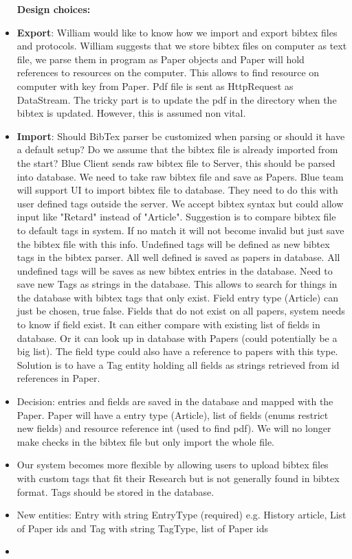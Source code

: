 \begin{itemize}
	\item [\textbf{Design choices:}]
	\item \textbf{Export}: William would like to know how we import and export bibtex files and protocols. William suggests that we store bibtex files on computer as text file, we parse them in program as Paper objects and Paper will hold references to resources on the computer. This allows to find resource on computer with key from Paper. Pdf file is sent as HttpRequest as DataStream. The tricky part is to update the pdf in the directory when the bibtex is updated. However, this is assumed non vital.
	\item \textbf{Import}: Should BibTex parser be customized when parsing or should it have a default setup? Do we assume that the bibtex file is already imported from the start? Blue Client sends raw bibtex file to Server, this should be parsed into database. We need to take raw bibtex file and save as Papers. Blue team will support UI to import bibtex file to database. They need to do this with user defined tags outside the server. We accept bibtex syntax but could allow input like "Retard" instead of "Article". Suggestion is to compare bibtex file to default tags in system. If no match it will not become invalid but just save the bibtex file with this info. Undefined tags will be defined as new bibtex tags in the bibtex parser. All well defined is saved as papers in database. All undefined tags will be saves as new bibtex entries in the database. Need to save new Tags as strings in the database. This allows to search for things in the database with bibtex tags that only exist. Field entry type (Article) can just be chosen, true false. Fields that do not exist on all papers, system needs to know if field exist. It can either compare with existing list of fields in database. Or it can look up in database with Papers (could potentially be a big list). The field type could also have a reference to papers with this type. Solution is to have a Tag entity holding all fields as strings retrieved from id references in Paper. 
	\item Decision: entries and fields are saved in the database and mapped with the Paper. Paper will have a entry type (Article), list of fields (enums restrict new fields) and resource reference int (used to find pdf). We will no longer make checks in the bibtex file but only import the whole file. 
	\item Our system becomes more flexible by allowing users to upload bibtex files with custom tags that fit their Research but is not generally found in bibtex format. Tags should be stored in the database. 
	\item New entities: Entry with string EntryType (required) e.g. History article, List of Paper ids and Tag with string TagType, list of Paper ids 
	\item 
\end{itemize}